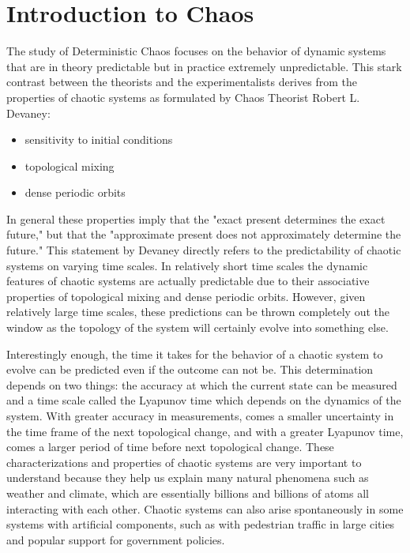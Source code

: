 \documentclass[twocolumn]{article}
\begin{document}
\section{Introduction to Chaos} 
\hspace{\parindent}The study of Deterministic Chaos focuses on the behavior of dynamic systems that are in theory predictable but in practice extremely unpredictable. This stark contrast between the theorists and the experimentalists derives from the properties of chaotic systems as formulated by Chaos Theorist Robert L. Devaney:
\begin{itemize}
  \item sensitivity to initial conditions
  \item topological mixing
  \item dense periodic orbits
\end{itemize}
In general these properties imply that the "exact present determines the exact future," but that the "approximate present does not approximately determine the future." This statement by Devaney directly refers to the predictability of chaotic systems on varying time scales. In relatively short time scales the dynamic features of chaotic systems are actually predictable due to their associative properties of topological mixing and dense periodic orbits. However, given relatively large time scales, these predictions can be thrown completely out the window as the topology of the system will certainly evolve into something else.  

Interestingly enough, the time it takes for the behavior of a chaotic system to evolve can be predicted even if the outcome can not be. This determination depends on two things: the accuracy at which the current state can be measured and a time scale called the Lyapunov time which depends on the dynamics of the system. With greater accuracy in measurements, comes a smaller uncertainty in the time frame of the next topological change, and with a greater Lyapunov time, comes a larger period of time before next topological change. These characterizations and properties of chaotic systems are very important to understand because they help us explain many natural phenomena such as weather and climate, which are essentially billions and billions of atoms all interacting with each other. Chaotic systems can also arise spontaneously in some systems with artificial components, such as with pedestrian traffic in large cities and popular support for government policies. 
\end{document}

